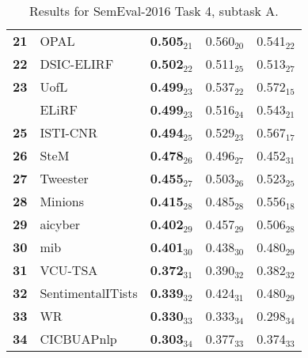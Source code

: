 \begin{table*}[tbh]
\begin{small}
\begin{tabular}{|c|l|l|l|l|}
\bf 21 & OPAL & \bf 0.505$_{21}$ & 0.560$_{20}$ & 0.541$_{22}$ \\
\bf 22 & DSIC-ELIRF & \bf 0.502$_{22}$ & 0.511$_{25}$ & 0.513$_{27}$ \\
\bf 23 & UofL & \bf 0.499$_{23}$ & 0.537$_{22}$ & 0.572$_{15}$ \\
& ELiRF & \bf 0.499$_{23}$ & 0.516$_{24}$ & 0.543$_{21}$ \\
\bf 25 & ISTI-CNR & \bf 0.494$_{25}$ & 0.529$_{23}$ & 0.567$_{17}$ \\
\bf 26 & SteM & \bf 0.478$_{26}$ & 0.496$_{27}$ & 0.452$_{31}$ \\
\bf 27 & Tweester & \bf 0.455$_{27}$ & 0.503$_{26}$ & 0.523$_{25}$ \\
\bf 28 & Minions & \bf 0.415$_{28}$ & 0.485$_{28}$ & 0.556$_{18}$ \\
\bf 29 & aicyber & \bf 0.402$_{29}$ & 0.457$_{29}$ & 0.506$_{28}$ \\
\bf 30 & mib & \bf 0.401$_{30}$ & 0.438$_{30}$ & 0.480$_{29}$ \\
\bf 31 & VCU-TSA & \bf 0.372$_{31}$ & 0.390$_{32}$ & 0.382$_{32}$ \\
\bf 32 & SentimentalITists & \bf 0.339$_{32}$ & 0.424$_{31}$ & 0.480$_{29}$ \\
\bf 33 & WR & \bf 0.330$_{33}$ & 0.333$_{34}$ & 0.298$_{34}$ \\
\bf 34 & CICBUAPnlp & \bf 0.303$_{34}$ & 0.377$_{33}$ & 0.374$_{33}$ \\
\hline
\end{tabular}
\caption{Results for SemEval-2016 Task 4, subtask A.}
\label{table:results}
\end{small}
\end{table*}
